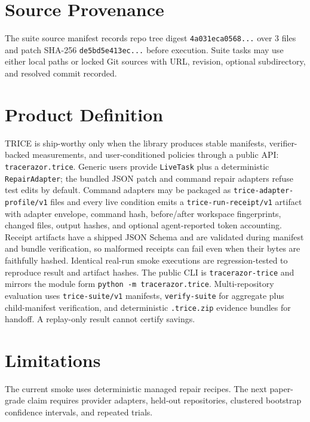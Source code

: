 \documentclass[10pt]{article}
\begin{document}
        \section{Source Provenance}
        The suite source manifest records repo tree digest \texttt{4a031eca0568...} over 3 files and patch SHA-256 \texttt{de5bd5e413ec...} before execution. Suite tasks may use either local paths or locked Git sources with URL, revision, optional subdirectory, and resolved commit recorded.

        \section{Product Definition}
        TRICE is ship-worthy only when the library produces stable manifests,
        verifier-backed measurements, and user-conditioned policies through a
        public API: \texttt{tracerazor.trice}. Generic users provide
        \texttt{LiveTask} plus a deterministic \texttt{RepairAdapter};
        the bundled JSON patch and command repair adapters refuse test edits
        by default. Command adapters may be packaged as
        \texttt{trice-adapter-profile/v1} files and every live condition emits
        a \texttt{trice-run-receipt/v1} artifact with adapter envelope,
        command hash, before/after workspace fingerprints, changed files,
        output hashes, and optional agent-reported token accounting. Receipt
        artifacts have a shipped JSON Schema and are validated during manifest
        and bundle verification, so malformed receipts can fail even when their
        bytes are faithfully hashed. Identical real-run smoke executions are
        regression-tested to reproduce result and artifact hashes. The public CLI is
        \texttt{tracerazor-trice} and mirrors the module form
        \texttt{python -m tracerazor.trice}. Multi-repository evaluation uses
        \texttt{trice-suite/v1} manifests, \texttt{verify-suite} for
        aggregate plus child-manifest verification, and deterministic
        \texttt{.trice.zip} evidence bundles for handoff. A replay-only
        result cannot certify savings.

        \section{Limitations}
        The current smoke uses deterministic managed repair recipes. The next
        paper-grade claim requires provider adapters, held-out repositories,
        clustered bootstrap confidence intervals, and repeated trials.

        
        
        
\end{document}
